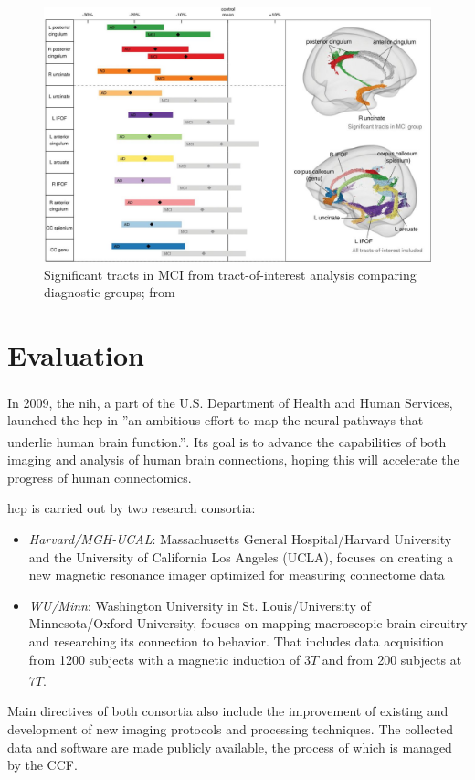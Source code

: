 \documentclass[plainreport]{cgvpub}
\newcommand{\newcite}[1]{\textsuperscript{\cite{#1}}}
\begin{document}
	\begin{figure}
		\includegraphics[width=\linewidth]{../pics/ad02}
		\caption[Significant tracts in MCI from tract-of-interest analysis comparing diagnostic groups]{Significant tracts in MCI from tract-of-interest analysis comparing diagnostic groups; from \cite{ad}}
		\label{fig:ad02}
	\end{figure}
	
	\chapter{Evaluation}
	In 2009, the \acrfull{nih}, a part of the U.S. Department of Health and Human Services\newcite{nih_about}, launched the \acrfull{hcp} in ''an ambitious effort to map the neural pathways that underlie human brain function.''\newcite{nih_connectome}. Its goal is to advance the capabilities of both imaging and analysis of human brain connections, hoping this will accelerate the progress of human connectomics. 
	
	\acrshort{hcp} is carried out by two research consortia:
	\begin{itemize}
		\item \emph{Harvard/MGH-UCAL}: Massachusetts General Hospital/Harvard University and the University of California Los Angeles (UCLA), focuses on creating a new magnetic resonance imager optimized for measuring connectome data
		\item \emph{WU/Minn}: Washington University in St. Louis/University of Minnesota/Oxford University, focuses on mapping macroscopic brain circuitry and researching its connection to behavior. That includes data acquisition from 1200 subjects with a magnetic induction of $ 3T $ and from 200 subjects at $ 7T $\newcite{wuminn}. 
	\end{itemize}
	Main directives of both consortia also include the improvement of existing and development of new imaging protocols and processing techniques. The collected data and software are made publicly available, the process of which is managed by the \Gls{CCF}. 
	
\end{document}

